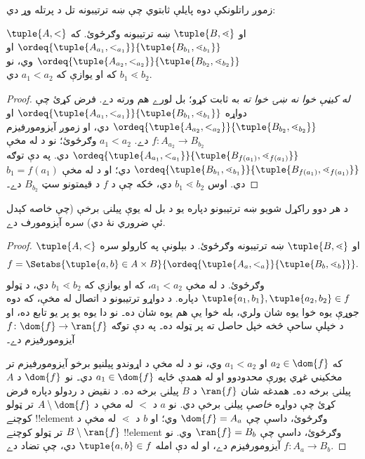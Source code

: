 \documentclass[../../../include/open-logic-section]{subfiles}
\begin{document}
زموږ راتلونکې دوه پايلې ثابتوي چې ښه ترتيبونه تل د پرتله وړ دي:

\begin{lem}
$\tuple{A, <}$ او $\tuple{B, \lessdot}$ ښه ترتيبونه وګرځوئ.
که $\ordeq{\tuple{A_{a_1}, <_{a_1}}}{\tuple{B_{b_1}, \lessdot_{b_1}}}$
او $\ordeq{\tuple{A_{{a_2}}, <_{a_2}}}{\tuple{B_{{b_2}},
\lessdot_{b_2}}}$ وي، نو ${a_1}  < {a_2} \text{ که او يوازې که }{b_1} \lessdot
{b_2}$ دي.
\end{lem}

\begin{proof}
\emph{له کيڼې خوا نه ښۍ خوا ته} به ثابت کړو؛ بل لورے هم ورته دے.
فرض کړئ چې دواړه
$\ordeq{\tuple{A_{a_1}, <_{a_1}}}{\tuple{B_{b_1},
\lessdot_{b_1}}}$ او $\ordeq{\tuple{A_{{a_2}},
<_{a_2}}}{\tuple{B_{{b_2}}, \lessdot_{b_2}}}$ دي، او زموږ
آيزومورفيزم $f \colon A_{{a_2}} \to B_{{b_2}}$ دے.
${a_1} < {a_2}$ وګرځوئ؛ نو د  له مخې
$\ordeq{\tuple{A_{a_1}, <_{a_1}}}{\tuple{B_{f({a_1})},
\lessdot_{f({a_1})}}}$ دي. په دې توګه
$\ordeq{\tuple{B_{b_1}, \lessdot_{b_1}}}{\tuple{B_{f({a_1})},
\lessdot_{f({a_1})}}}$ دي؛ او د  له مخې
${b_1} = f({a_1})$ دي. اوس ${b_1} \lessdot {b_2}$ دي، ځکه چې
د $f$ د قيمتونو سټ $B_{{b_2}}$ دے۔
\end{proof}

\begin{thm}
د هر دوو راکړل شويو ښه ترتيبونو دپاره يو د بل له يوې پيلنۍ برخې
(چې خاصه کېدل ئې ضروري نۀ دي) سره آيزومورف دے.
\end{thm}

\begin{proof}
$\tuple{A, <}$ او $\tuple{B, \lessdot}$ ښه ترتيبونه وګرځوئ.
د بېلونې په کارولو سره
\[
	f = \Setabs{\tuple{a, b} \in A \times B}{
		\ordeq{\tuple{A_a, <_a}}{\tuple{B_b, \lessdot_b}}}.
\]
وګرځوئ. د  له مخې
$a_1 < a_2$، که او يوازې که $b_1 \lessdot b_2$ دي، د ټولو
$\tuple{a_1, b_1}, \tuple{a_2, b_2} \in f$ دپاره.
د دواړو ترتيبونو د اتصال له مخې، که دوه جوړې يوه خوا
يوه شان ولري، بله خوا يې هم يوه شان ده۔ نو دا يوه يو پر
يو تابع ده، او د خپلې ساحې څخه خپل حاصل ته پر ټوله ده۔
په دې توګه $f \colon \dom{f} \to \ran{f}$ آيزومورفيزم دے۔

که $a_2 \in \dom{f}$ او $a_1 < a_2$ وي، نو د
 له مخې د اړوندو پيلنيو برخو
آيزومورفيزم تر مخکيني غړي پورې محدودوو او له همدې ځايه
$a_1 \in \dom{f}$ دي۔ نو $\dom{f}$ د $A$ پيلنۍ برخه ده۔ همدغه شان $\ran{f}$ د $B$
پيلنۍ برخه ده. د نقيض د ردولو دپاره فرض کړئ چې دواړه
\emph{خاصې} پيلنۍ برخې دي. نو $a$ د $<$ له مخې د $A \setminus \dom{f}$
تر ټولو کوچنے !!{element} وګرځوئ، داسې چې
$\dom{f} = A_a$ وي؛ او $b$ د $\lessdot$ له مخې د $B \setminus \ran{f}$
تر ټولو کوچنے !!{element} وګرځوئ، داسې چې $\ran{f} = B_b$
وي. نو $f \colon A_a \to B_b$ آيزومورفيزم دے، او له دې امله
$\tuple{a, b} \in f$ دي، چې تضاد دے.
\end{proof}
\end{document}
